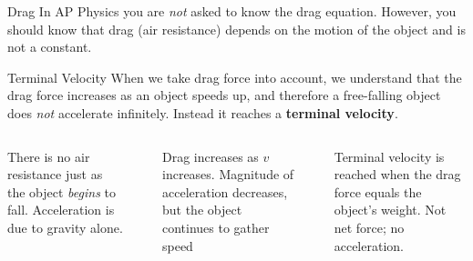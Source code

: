 \documentclass[12pt,compress,aspectratio=169]{beamer}
\newcommand{\mb}[1]{\ensuremath\mathbf{#1}}
\begin{document}
\begin{frame}{Drag}
  In AP Physics you are \emph{not} asked to know the drag equation. However,
  you should know that drag (air resistance) depends on the motion of the
  object and is not a constant.
\end{frame}


\begin{frame}{Terminal Velocity}
  When we take drag force into account, we understand that the drag force
  increases as an object speeds up, and therefore a free-falling object does
  \emph{not} accelerate infinitely. Instead it reaches a
  \textbf{terminal velocity}.

  \begin{columns}
    
    {\footnotesize There is no air resistance just as the object \emph{begins}
      to fall. Acceleration is due to gravity alone.\par}

    \vspace{-.15in}
    \begin{center}
    \end{center}
    

    {\footnotesize Drag increases as $v$ increases. Magnitude of acceleration
      decreases, but the object continues to gather speed\par}

    \vspace{-.15in}
    \begin{center}
    \end{center}
    
    
    {\footnotesize Terminal velocity is reached when the drag force equals the
      object's weight. Not net force; no acceleration.\par}


\end{columns}
\end{frame}
\end{document}
